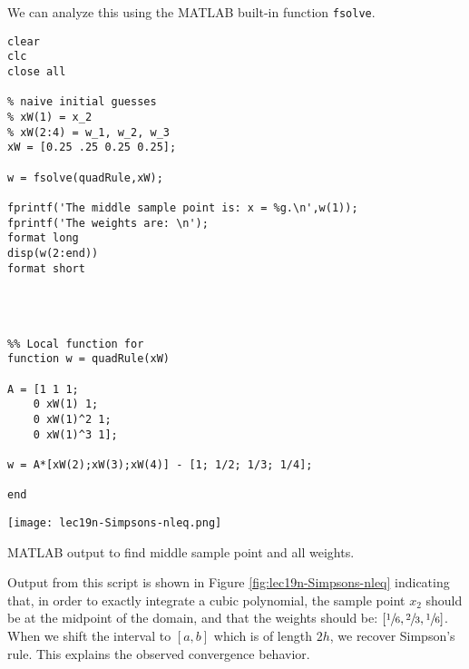 We can analyze this using the MATLAB built-in function \lstinline[style=myMatlab]{fsolve}.

\begin{lstlisting}[style=myMatlab,name=lec19n-nq]
clear
clc
close all

% naive initial guesses
% xW(1) = x_2
% xW(2:4) = w_1, w_2, w_3
xW = [0.25 .25 0.25 0.25];

w = fsolve(quadRule,xW);

fprintf('The middle sample point is: x = %g.\n',w(1));
fprintf('The weights are: \n');
format long
disp(w(2:end))
format short




%% Local function for 
function w = quadRule(xW)

A = [1 1 1;
    0 xW(1) 1;
    0 xW(1)^2 1;
    0 xW(1)^3 1];

w = A*[xW(2);xW(3);xW(4)] - [1; 1/2; 1/3; 1/4];

end
\end{lstlisting}

\begin{marginfigure}
\texttt{[image: lec19n-Simpsons-nleq.png]}
\caption{MATLAB output to find middle sample point and all weights.}
\label{fig:lec19n-Simpsons-nleq}
\end{marginfigure}

Output from this script is shown in Figure \ref{fig:lec19n-Simpsons-nleq} indicating that, in order to exactly integrate a cubic polynomial, the sample point $x_2$ should be at the midpoint of the domain, and that the weights should be: $[\sfrac{1}{6}, \sfrac{2}{3}, \sfrac{1}{6}]$.  When we shift the interval to $[a,b]$ which is of length $2h$, we recover Simpson's rule.  This explains the observed convergence behavior.

